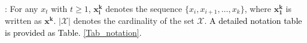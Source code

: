 : For any $x_t$ with $t\ge1$, $\bm{x_i^k}$ denotes the sequence $\{x_i,x_{i+1},\ldots,x_{k}\}$, where $\bm{x_1^k}$ is written as $\bm{x^k}$. %
$|\mathcal{X}|$ denotes the cardinality of the set $\mathcal{X}$. \textcolor{black}{A detailed notation table is provided as Table. \ref{Tab_notation}.}